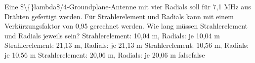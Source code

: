     {Eine \$\textbackslash\{\}lambda\$/4-Groundplane-Antenne mit vier Radials soll für 7,1 MHz aus Drähten gefertigt werden. Für Strahlerelement und Radials kann mit einem Verkürzungsfaktor von 0,95 gerechnet werden. Wie lang müssen Strahlerelement und Radials jeweils sein?}
    {Strahlerelement: 10,04 m, Radials: je 10,04 m}
    {Strahlerelement: 21,13 m, Radials: je 21,13 m}
    {Strahlerelement: 10,56 m, Radials: je 10,56 m}
    {Strahlerelement: 20,06 m, Radials: je 20,06 m}
    {false}{false}